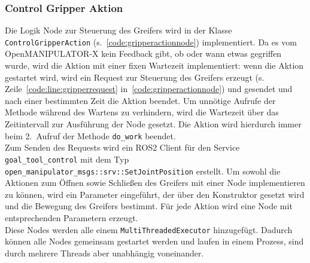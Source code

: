 \subsubsection{Control Gripper Aktion}
Die Logik Node zur Steuerung des Greifers wird in der Klasse \verb|ControlGripperAction| (s.~\ref{code:gripperactionnode}) implementiert.
Da es vom OpenMANIPULATOR-X kein Feedback gibt, ob oder wann etwas gegriffen wurde, wird die Aktion mit einer fixen Wartezeit implementiert: wenn die Aktion gestartet wird, wird ein Request zur Steuerung des Greifers erzeugt (s. Zeile~\ref{code:line:gripperrequest} in~\ref{code:gripperactionnode}) und gesendet und nach einer bestimmten Zeit die Aktion beendet.
Um unnötige Aufrufe der Methode während des Wartens zu verhindern, wird die Wartezeit über das Zeitintervall zur Ausführung der Node gesetzt.
Die Aktion wird hierdurch immer beim 2.\ Aufruf der Methode \verb|do_work| beendet.\\
Zum Senden des Requests wird ein \ac{ROS2} Client für den Service \verb|goal_tool_control| mit dem Typ \verb|open_manipulator_msgs::srv::SetJointPosition| erstellt. 
Um sowohl die Aktionen zum Öffnen sowie Schließen des Greifers mit einer Node implementieren zu können, wird ein Parameter eingeführt, der über den Konstruktor gesetzt wird und die Bewegung des Greifers bestimmt.
Für jede Aktion wird eine Node mit entsprechenden Parametern erzeugt.\\
Diese Nodes werden alle einem \verb|MultiThreadedExecutor| hinzugefügt. Dadurch können alle Nodes gemeinsam gestartet werden und laufen in einem Prozess, sind durch mehrere Threads aber unabhängig voneinander.

